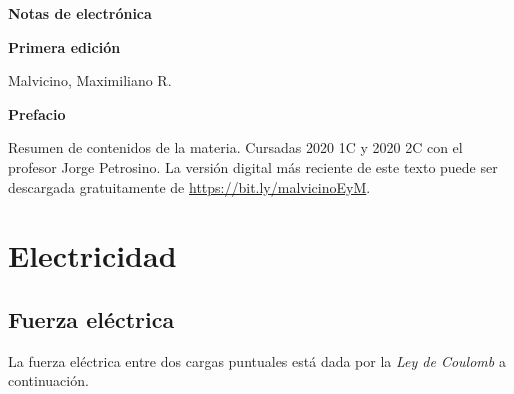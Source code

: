 \documentclass[a5paper,12pt,twoside]{book}
\begin{document}
\pagestyle{fancy}
\fancyhf{}
\chead{\scriptsize \nouppercase\rightmark}
\cfoot{\scriptsize \thepage}
\renewcommand{\headrulewidth}{0pt}

\frontmatter
% 

\begin{center}
    \begin{Huge}
        \textbf{Notas de electrónica}
    \end{Huge}

    \vspace{1cm}
    \textbf{Primera edición}
    \vspace{2cm}

    \begin{Large}
        Malvicino, Maximiliano R.
    \end{Large}
\end{center}

\clearpage
\noindent
\textbf{Prefacio}

Resumen de contenidos de la materia. Cursadas 2020 1C y 2020 2C con el profesor Jorge Petrosino. La versión digital más reciente de este texto puede ser descargada gratuitamente de \url{https://bit.ly/malvicinoEyM}.

\renewcommand{\spanishappendixname}{Anexo}
\tableofcontents

\mainmatter
{}


\chapter{Electricidad}






\section{Fuerza eléctrica}

La fuerza eléctrica entre dos cargas puntuales está dada por la \emph{Ley de Coulomb} a continuación.
\end{document}
